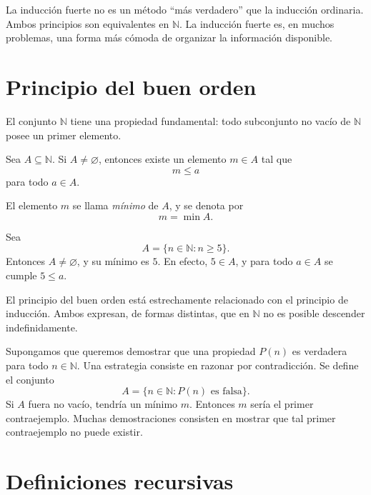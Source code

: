 \begin{advertencia}
La inducción fuerte no es un método ``más verdadero'' que la inducción ordinaria. Ambos principios son equivalentes en \(\mathbb{N}\). La inducción fuerte es, en muchos problemas, una forma más cómoda de organizar la información disponible.
\end{advertencia}

\section{Principio del buen orden}

El conjunto \(\mathbb{N}\) tiene una propiedad fundamental: todo subconjunto no vacío de \(\mathbb{N}\) posee un primer elemento.

\begin{teorema}
Sea \(A\subseteq\mathbb{N}\). Si \(A\neq\varnothing\), entonces existe un elemento \(m\in A\) tal que
\[
  m\leq a
\]
para todo \(a\in A\).
\end{teorema}

El elemento \(m\) se llama \emph{mínimo} de \(A\), y se denota por
\[
  m=\min A.
\]

\begin{ejemplo}
Sea
\[
  A=\{n\in\mathbb{N}: n\geq 5\}.
\]
Entonces \(A\neq\varnothing\), y su mínimo es \(5\). En efecto, \(5\in A\), y para todo \(a\in A\) se cumple \(5\leq a\).
\end{ejemplo}

El principio del buen orden está estrechamente relacionado con el principio de inducción. Ambos expresan, de formas distintas, que en \(\mathbb{N}\) no es posible descender indefinidamente.

\begin{ejemplo}
Supongamos que queremos demostrar que una propiedad \(P(n)\) es verdadera para todo \(n\in\mathbb{N}\). Una estrategia consiste en razonar por contradicción. Se define el conjunto
\[
  A=\{n\in\mathbb{N}: P(n) \text{ es falsa}\}.
\]
Si \(A\) fuera no vacío, tendría un mínimo \(m\). Entonces \(m\) sería el primer contraejemplo. Muchas demostraciones consisten en mostrar que tal primer contraejemplo no puede existir.
\end{ejemplo}

\section{Definiciones recursivas}

